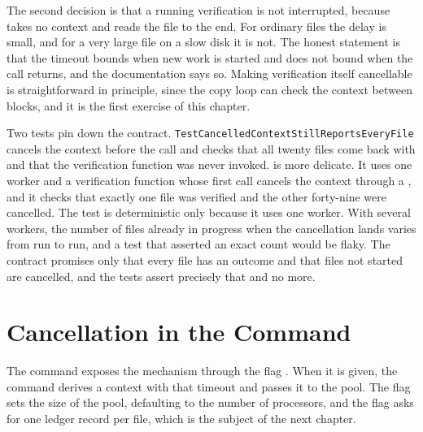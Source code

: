 The second decision is that a running verification is not interrupted, because  takes no context and reads the file to the end. For ordinary files the delay is small, and for a very large file on a slow disk it is not. The honest statement is that the timeout bounds when new work is started and does not bound when the call returns, and the documentation says so. Making verification itself cancellable is straightforward in principle, since the copy loop can check the context between blocks, and it is the first exercise of this chapter.


Two tests pin down the contract. \texttt{Test\-Cancelled\-Context\-Still\-Reports\-Every\-File} cancels the context before the call and checks that all twenty files come back with  and that the verification function was never invoked.  is more delicate. It uses one worker and a verification function whose first call cancels the context through a , and it checks that exactly one file was verified and the other forty-nine were cancelled. The test is deterministic only because it uses one worker. With several workers, the number of files already in progress when the cancellation lands varies from run to run, and a test that asserted an exact count would be flaky. The contract promises only that every file has an outcome and that files not started are cancelled, and the tests assert precisely that and no more.

\section{Cancellation in the Command}

The  command exposes the mechanism through the flag . When it is given, the command derives a context with that timeout and passes it to the pool. The flag  sets the size of the pool, defaulting to the number of processors, and the flag  asks for one ledger record per file, which is the subject of the next chapter.



